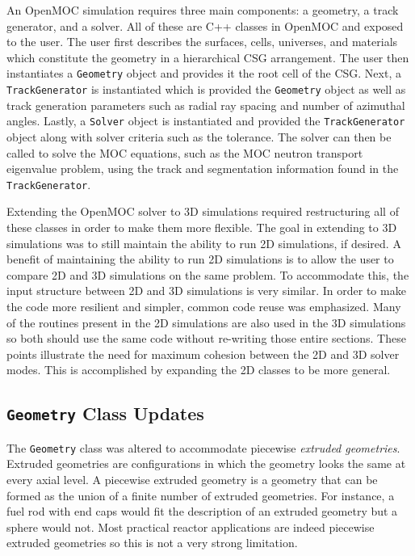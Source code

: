 An OpenMOC simulation requires three main components: a geometry, a track generator, and a solver. All of these are C++ classes in OpenMOC and exposed to the user. The user first describes the surfaces, cells, universes, and materials which constitute the geometry in a hierarchical CSG arrangement. The user then instantiates a \texttt{Geometry} object and provides it the root cell of the CSG. Next, a \texttt{TrackGenerator} is instantiated which is provided the \texttt{Geometry} object as well as track generation parameters such as radial ray spacing and number of azimuthal angles. Lastly, a \texttt{Solver} object is instantiated and provided the \texttt{TrackGenerator} object along with solver criteria such as the tolerance. The solver can then be called to solve the MOC equations, such as the MOC neutron transport eigenvalue problem, using the track and segmentation information found in the \texttt{TrackGenerator}.

Extending the OpenMOC solver to 3D simulations required restructuring all of these classes in order to make them more flexible. The goal in extending to 3D simulations was to still maintain the ability to run 2D simulations, if desired. A benefit of maintaining the ability to run 2D simulations is to allow the user to compare 2D and 3D simulations on the same problem. To accommodate this, the input structure between 2D and 3D simulations is very similar. In order to make the code more resilient and simpler, common code reuse was emphasized. Many of the routines present in the 2D simulations are also used in the 3D simulations so both should use the same code without re-writing those entire sections. These points illustrate the need for maximum cohesion between the 2D and 3D solver modes. This is accomplished by expanding the 2D classes to be more general.

\subsection{\texttt{Geometry} Class Updates}
\label{sec:oo-geometry}

The \texttt{Geometry} class was altered to accommodate piecewise \textit{extruded geometries}. Extruded geometries are configurations in which the geometry looks the same at every axial level. A piecewise extruded geometry is a geometry that can be formed as the union of a finite number of extruded geometries. For instance, a fuel rod with end caps would fit the description of an extruded geometry but a sphere would not. Most practical reactor applications are indeed piecewise extruded geometries so this is not a very strong limitation. 

